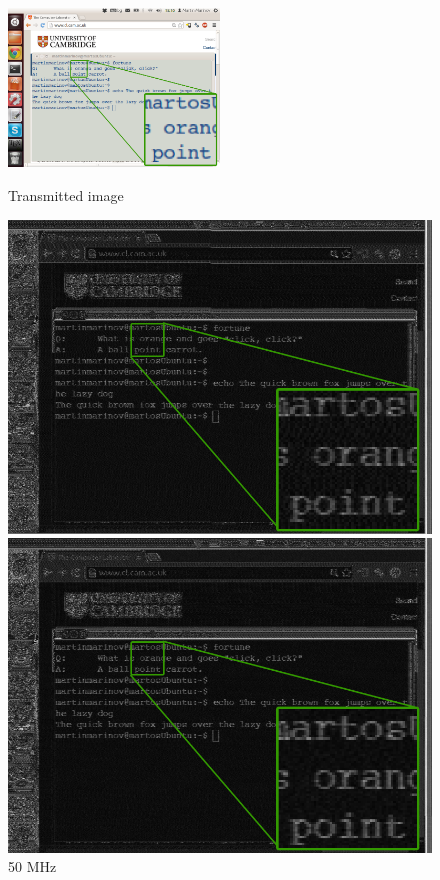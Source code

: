 \documentclass[a4paper,12pt,twoside,openright]{report}
\begin{document}
{{{{{\begin{figure}[h!]
  \centering
    \includegraphics[width=0.5\textwidth]{sr_original}
  \caption{Transmitted image}
\endminipage\hfill
{}
  \centering
    \includegraphics[width=\linewidth]{sr_50MHz_at_190MHz}
  \caption{50 MHz}
\endminipage\hfill
{}
  \centering
    \includegraphics[width=\linewidth]{sr_40MHz_at_190MHz}

\end{figure}}}}}}
\end{document}
